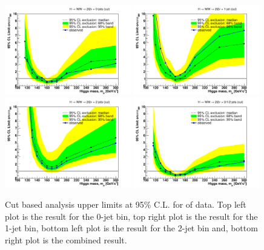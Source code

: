 \begin{figure}[!htbp]
\begin{center}
   \includegraphics[width=0.49\textwidth]{figures/limits_0j_cut.pdf}
   \includegraphics[width=0.49\textwidth]{figures/limits_1j_cut.pdf}
   \includegraphics[width=0.49\textwidth]{figures/limits_2j_cut.pdf}
   \includegraphics[width=0.49\textwidth]{figures/limits_nj_cut.pdf}
   \caption{Cut based analysis upper limits at 95\% C.L. for \intlumi of data. Top left plot 
   is the result for the 0-jet bin, top right plot is the result for the 1-jet bin, bottom left plot 
   is the result for the 2-jet bin and, bottom right plot is the combined result.}
   \label{fig:cutbase_uls_data}
\end{center}
\end{figure}

